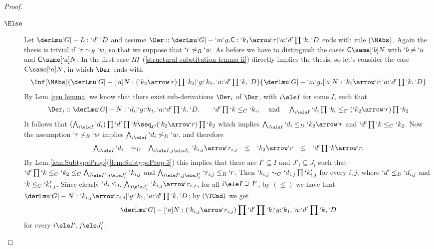\documentclass{lmcs}
\begin{document}
\begin{proof}
\begin{enumerate}
\begin{description}
 \item [$\Else$]
Let $\derLmu `G |- L : `d' | `D $ and assume $\Der::\derLmu `G |- `m`g.\Cmd : `k_1\arrow `r | `a{:}`d'\prod`k,`D $ ends with rule $(\MAbs)$. Again the thesis
is trivial if $`r \sim_R `w$, so that we suppose that $`r \not\sim_R `w$. As before we have to distinguish the cases
$\Cmd \same [`b]N$ with $`b \neq `a$ and $\Cmd \same [`a]N$. In the first case \emph{IH}~(\ref{structural substitution lemma ii}) directly implies the thesis, so let's consider the case $\Cmd \same [`a]N$, in which $\Der$ ends with
 \[ \begin{array}{c}
\Inf[\MAbs]
	{\derLmu `G |- {[`a]N}: (`k_2\arrow `r)\prod `k_2 | `g{:}`k_1, `a{:}`d'\prod `k,`D }
	{\derLmu `G |- {`m `g.[`a]N} : `k_1\arrow `r | `a{:}`d'\prod `k,`D }
 \end{array}\]
By Lem.\skp\ref{gen lemma} we know that there exist sub-derivations $\Der_i$ of $\Der$, with $i\ele I$ for some $I$, such that
 \[ \begin{array}{ccccc}
\Der_i:: \derLmu `G |- {N}: `d_i | `g{:}`k_1, `a{:}`d'\prod `k,`D, & &
`d'\prod `k \leq_C `k_i, & \textrm{ and } & \bigwedge_{i\ele I} `d_i\prod `k_i \leq_C (`k_2\arrow `r)\prod `k_2
 \end{array}\]
It follows that
$(\bigwedge_{i\ele I} `d_i)\prod `d'\prod `k \seq_C (`k_2\arrow `r)\prod `k_2$ which implies
$\bigwedge_{i\ele I} `d_i \leq_D `k_2\arrow `r$ and $`d'\prod `k \leq_C `k_2$.
Now the assumption $`r \not\sim_R `w$ implies $\bigwedge_{i\ele I} `d_i \not\sim_D `w$, and therefore
 \[ \begin{array}{rcl@{\quad}lccc}
\bigwedge_{i\ele I} `d_i &\sim_D& \bigwedge_{i\ele I, j\ele J_i}\, `k_{i,j}\arrow `r_{i,j} &\leq& `k_2\arrow `r &\leq& `d'\prod `k\arrow`r.
 \end{array} \]
By Lem.\skp\ref{lem:SubtypeProp}\skp(\ref{lem:SubtypeProp-3}) this implies that there are $I' \subseteq I$ and $J'_i \subseteq J_i$ such that
$`d'\prod `k \leq_C `k_2 \leq_C \bigwedge_{i\ele I', j\ele J'_i}\, `k_{i,j}$ and $\bigwedge_{i\ele I', j\ele J'_i}\, `r_{i,j} \leq_R `r$.
Then $`k_{i,j} \sim_C `d_{i,j}\prod `k'_{i,j}$ for every $i,j$, where $`d' \leq_D `d_{i,j}$ and 
$`k \leq_C `k'_{i,j}$. Since clearly $`d_i \leq_D \bigwedge_{j\ele J'_i}\, `k_{i,j}\arrow `r_{i,j}$, for all $i\ele I \supseteq I'$,
by $(\leq)$ we have that
$\derLmu `G |- N : `k_{i,j}\arrow `r_{i,j} | `g{:}`k_1, `a{:}`d'\prod `k,`D $; by $(\TCmd)$ we get
 \[ \derLmu `G |- {[`a]N}: (`k_{i,j}\arrow `r_{i,j})\prod `d'\prod `k | `g{:}`k_1, `a{:}`d'\prod `k,`D \]
for every $i\ele I', j\ele J'_i$. 

\end{description}
\end{enumerate}
\end{proof}
\end{document}
